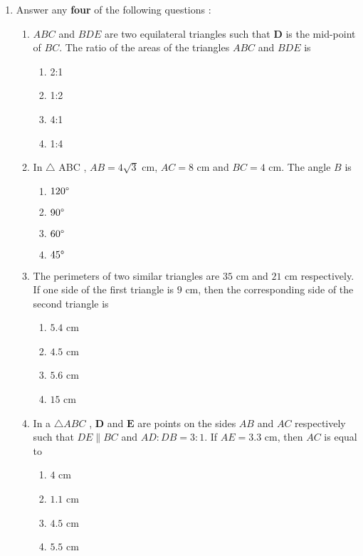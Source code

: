 \documentclass{article}
\let\vec\mathbf
\begin{document}
\begin{enumerate}
        \item Answer any \textbf{four} of the following questions :
        \begin{enumerate}[label=(\roman*)]
        \item $ABC$ and $BDE$ are two equilateral triangles such that $\vec{D}$ is the mid-point of $BC$. The ratio of the areas of the triangles $ABC$ and $BDE$ is
        \begin{enumerate}[label=(\Alph*)]
            \item 2:1
            \item 1:2
            \item 4:1
            \item 1:4
        \end{enumerate}
        
        \item In $\triangle$ ABC , $AB=4\sqrt{3}$ cm, $AC=8$ cm and $BC=4$ cm. The angle $B$ is

        \begin{enumerate}[label=(\Alph*)]
            \item $120\degree$
            \item $90\degree$
            \item $60\degree$
            \item $45\degree$
        \end{enumerate}
         
        \item The perimeters of two similar triangles are $35$ cm and $21$ cm respectively.  If one side of the first triangle is $9$ cm, then the corresponding side of the second triangle is 
        
         \begin{enumerate}[label=(\Alph*)]
            \item $5.4$ cm
            \item $4.5$ cm
            \item $5.6$ cm
            \item $15$ cm
        \end{enumerate}
        
        \item In a $\triangle ABC$ , $\vec{D}$ and $\vec{E}$ are points on the sides $AB$ and $AC$ respectively such that $DE\parallel BC$ and $AD:DB=3:1$. If $AE=3.3 $ cm, then $AC$ is equal to
        \begin{enumerate}[label=(\Alph*)]
            \item $4$ cm
            \item $1.1$ cm
            \item $4.5$ cm
            \item $5.5$ cm
        \end{enumerate}
        

\end{enumerate}
\end{enumerate}
\end{document}
